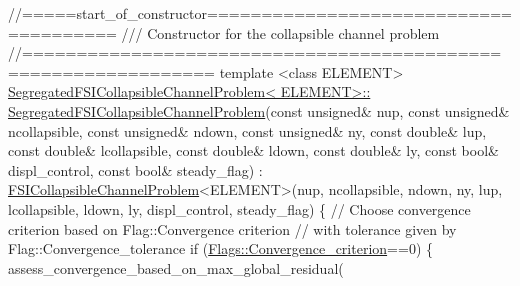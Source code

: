  
\begin{DoxyCodeInclude}
\textcolor{comment}{//=====start\_of\_constructor======================================}
\textcolor{comment}{/// Constructor for the collapsible channel problem}
\textcolor{comment}{}\textcolor{comment}{//===============================================================}
\textcolor{keyword}{template} <\textcolor{keyword}{class} ELEMENT>
\hyperlink{classSegregatedFSICollapsibleChannelProblem_ac762b472c2baafa23dae6b9ce38f31da}{SegregatedFSICollapsibleChannelProblem< ELEMENT>::}
\hyperlink{classSegregatedFSICollapsibleChannelProblem_ac762b472c2baafa23dae6b9ce38f31da}{SegregatedFSICollapsibleChannelProblem}(\textcolor{keyword}{const} \textcolor{keywordtype}{unsigned}& nup, 
                                       \textcolor{keyword}{const} \textcolor{keywordtype}{unsigned}& ncollapsible,
                                       \textcolor{keyword}{const} \textcolor{keywordtype}{unsigned}& ndown,
                                       \textcolor{keyword}{const} \textcolor{keywordtype}{unsigned}& ny,
                                       \textcolor{keyword}{const} \textcolor{keywordtype}{double}& lup,
                                       \textcolor{keyword}{const} \textcolor{keywordtype}{double}& lcollapsible, 
                                       \textcolor{keyword}{const} \textcolor{keywordtype}{double}& ldown,
                                       \textcolor{keyword}{const} \textcolor{keywordtype}{double}& ly,
                                       \textcolor{keyword}{const} \textcolor{keywordtype}{bool}& displ\_control,
                                       \textcolor{keyword}{const} \textcolor{keywordtype}{bool}& steady\_flag) :
 \hyperlink{classFSICollapsibleChannelProblem}{FSICollapsibleChannelProblem}<ELEMENT>(nup, 
                                       ncollapsible,
                                       ndown,
                                       ny,
                                       lup,
                                       lcollapsible, 
                                       ldown,
                                       ly,
                                       displ\_control,
                                       steady\_flag) 
\{
 \textcolor{comment}{// Choose convergence criterion based on Flag::Convergence criterion}
 \textcolor{comment}{// with tolerance given by Flag::Convergence\_tolerance}
 \textcolor{keywordflow}{if} (\hyperlink{namespaceFlags_aba930ff1e462e642a27904df95baab7c}{Flags::Convergence\_criterion}==0)
  \{
   assess\_convergence\_based\_on\_max\_global\_residual(

\end{DoxyCodeInclude}
